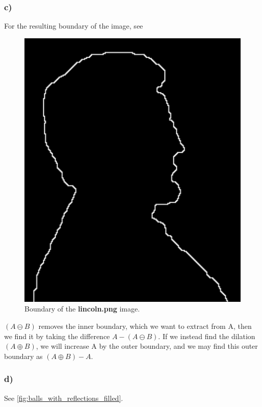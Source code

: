 \subsubsection*{c)}
For the resulting boundary of the image, see 

\begin{figure}[]
    \centering
    \includegraphics[width=1.00\textwidth]{figures/image_processed/lincoln-boundary.png}
    \caption{Boundary of the \textbf{lincoln.png} image. }
    \label{fig:lincoln_boundary}
\end{figure}

$(A \ominus B)$ removes the inner boundary, which we want to extract from A, then we find it by taking the difference $A - (A \ominus B)$. If we instead find the dilation $(A \oplus B)$, we will increase A by the outer boundary, and we may find this outer boundary as $(A \oplus B) - A$. 

\subsubsection*{d)}
See \cref{fig:balls_with_reflections_filled}. 

